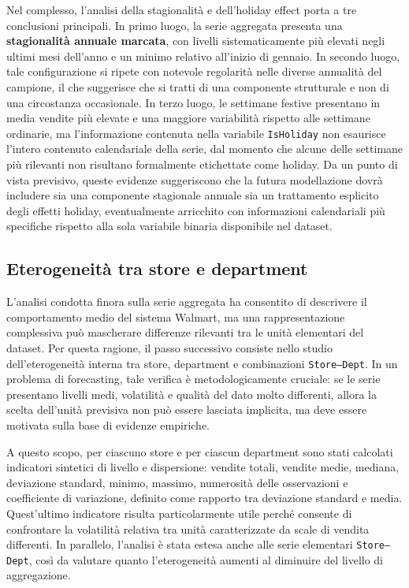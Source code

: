 \documentclass[a4paper,12pt]{article}
\begin{document}
Nel complesso, l’analisi della stagionalità e dell’holiday effect porta a tre conclusioni principali. In primo luogo, la serie aggregata presenta una \textbf{stagionalità annuale marcata}, con livelli sistematicamente più elevati negli ultimi mesi dell’anno e un minimo relativo all’inizio di gennaio. In secondo luogo, tale configurazione si ripete con notevole regolarità nelle diverse annualità del campione, il che suggerisce che si tratti di una componente strutturale e non di una circostanza occasionale. In terzo luogo, le settimane festive presentano in media vendite più elevate e una maggiore variabilità rispetto alle settimane ordinarie, ma l’informazione contenuta nella variabile \texttt{IsHoliday} non esaurisce l’intero contenuto calendariale della serie, dal momento che alcune delle settimane più rilevanti non risultano formalmente etichettate come holiday. Da un punto di vista previsivo, queste evidenze suggeriscono che la futura modellazione dovrà includere sia una componente stagionale annuale sia un trattamento esplicito degli effetti holiday, eventualmente arricchito con informazioni calendariali più specifiche rispetto alla sola variabile binaria disponibile nel dataset.

\subsection{Eterogeneità tra store e department}

L’analisi condotta finora sulla serie aggregata ha consentito di descrivere il comportamento medio del sistema Walmart, ma una rappresentazione complessiva può mascherare differenze rilevanti tra le unità elementari del dataset. Per questa ragione, il passo successivo consiste nello studio dell’eterogeneità interna tra store, department e combinazioni \texttt{Store--Dept}. In un problema di forecasting, tale verifica è metodologicamente cruciale: se le serie presentano livelli medi, volatilità e qualità del dato molto differenti, allora la scelta dell’unità previsiva non può essere lasciata implicita, ma deve essere motivata sulla base di evidenze empiriche.

A questo scopo, per ciascuno store e per ciascun department sono stati calcolati indicatori sintetici di livello e dispersione: vendite totali, vendite medie, mediana, deviazione standard, minimo, massimo, numerosità delle osservazioni e coefficiente di variazione, definito come rapporto tra deviazione standard e media. Quest’ultimo indicatore risulta particolarmente utile perché consente di confrontare la volatilità relativa tra unità caratterizzate da scale di vendita differenti. In parallelo, l’analisi è stata estesa anche alle serie elementari \texttt{Store--Dept}, così da valutare quanto l’eterogeneità aumenti al diminuire del livello di aggregazione.
\end{document}
